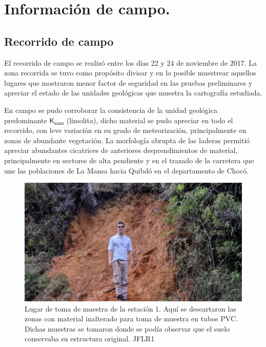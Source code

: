 

\chapter{Informaci\'on de campo.}

\section{Recorrido de campo}
\label{recorridocampo}

El recorrido de campo se realiz\'o entre los d\'ias 22 y 24 de noviembre de 2017. La zona recorrida se tuvo como prop\'osito divisar y en lo posible muestrear aquellos lugares que mostraron menor factor de seguridad en las pruebas preliminares y apreciar el estado de las unidades geol\'ogicas que muestra la cartograf\'ia estudiada.

En campo se pudo corroborar la consistencia de la unidad geol\'ogica predominante \(\mathsf{K_{saau}}\) (limolita), dicho material se pudo apreciar en todo el recorrido, con leve variaci\'on en su grado de meteorizaci\'on, principalmente en zonas de abundante vegetaci\'on. La morfolog\'ia abrupta de las laderas permiti\'o apreciar abundantes cicatrices de anteriores desprendimientos de material, principalmente en sectores de alta pendiente y en el trazado de la carretera que une las poblaciones de La Mansa hacia Quibd\'o en el departamento de Choc\'o.

\begin{figure}[H]
  \centering
  \includegraphics[scale=0.75]{img/estacion10.jpg}
  \caption{Lugar de toma de muestra de la estaci\'on 1. Aqu\'i se descartaron las zonas con material inalterado para toma de muestra en tubos PVC. Dichas muestras se tomaron donde se pod\'ia observar que el suelo conservaba su estructura original. JFLR1 }
  \label{fig:afloramiento}
\end{figure}

